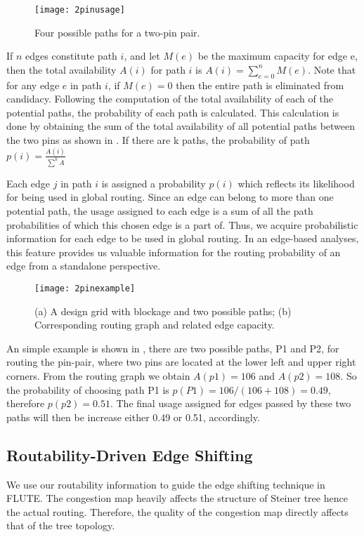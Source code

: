 \begin{itemize}
\begin{figure}[tbh!]
    \centering
    \texttt{[image: 2pinusage]}
    \caption{Four possible paths for a two-pin pair.}
    \label{fig:2pinusage}
\end{figure}

If $n$ edges constitute path $i$, and let $M(e)$ be the maximum capacity for edge e, then the total availability $A(i)$ for path $i$ is $A(i)=\sum_{e=0}^{n}M(e)$. Note that for any edge $e$ in path $i$, if $M(e)=0$ then the entire path is eliminated from candidacy. Following the computation of the total availability of each of the potential paths, the probability of each path is calculated. This calculation is done by obtaining the sum of the total availability of all potential paths between the two pins as shown in .
If there are k paths, the probability of path $p(i)=\frac{A(i)}{\sum^{k}A}$

Each edge $j$ in path $i$ is assigned a probability $p(i)$ which reflects its likelihood for being used in global routing. Since an edge can belong to more than one potential path, the usage assigned to each edge is a sum of all the path probabilities of which this chosen edge is a part of. Thus, we acquire probabilistic information for each edge to be used in global routing. In an edge-based analyses, this feature provides us valuable information for the routing probability of an edge from a standalone perspective.

\begin{figure}[tb!]
    \centerline{\texttt{[image: 2pinexample]}}
    \caption{(a) A design grid with blockage and two possible paths; (b) Corresponding routing graph and related edge capacity.}
    \label{fig:2pinexample}
\end{figure}
An simple example is shown in , there are two possible paths, P1 and P2, for routing the pin-pair, where two pins are located at the lower left and upper right corners. From the routing graph we obtain $A(p1)=106$ and $A(p2)=108$. So the probability of choosing path P1 is $p(P1)=106/(106+108)=0.49$, therefore $p(p2)=0.51$. The final usage assigned for edges passed by these two paths will then be increase either 0.49 or 0.51, accordingly.
\end{itemize}

\subsection{Routability-Driven Edge Shifting}
We use our routability information to guide the edge shifting technique in FLUTE\cite{fastroute}. The congestion map heavily affects the structure of Steiner tree hence the actual routing. Therefore, the quality of the congestion map directly affects that of the tree topology.

